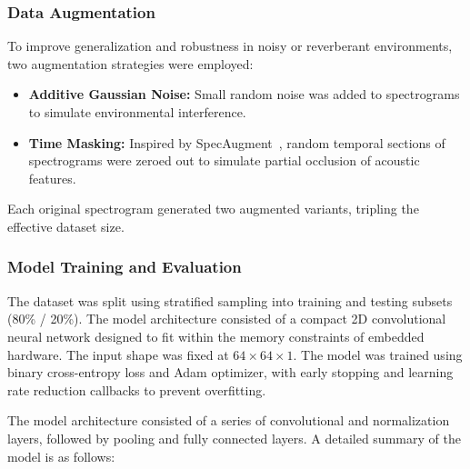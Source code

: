 \subsubsection{Data Augmentation}
To improve generalization and robustness in noisy or reverberant environments, two augmentation strategies were employed:

\begin{itemize}
  \item \textbf{Additive Gaussian Noise:} Small random noise was added to spectrograms to simulate environmental interference.
  \item \textbf{Time Masking:} Inspired by SpecAugment~\cite{Park2019specaugment}, random temporal sections of spectrograms were zeroed out to simulate partial occlusion of acoustic features.
\end{itemize}

Each original spectrogram generated two augmented variants, tripling the effective dataset size.

\subsubsection{Model Training and Evaluation}
The dataset was split using stratified sampling into training and testing subsets (80\% / 20\%). The model architecture consisted of a compact 2D convolutional neural network designed to fit within the memory constraints of embedded hardware. The input shape was fixed at $64 \times 64 \times 1$. The model was trained using binary cross-entropy loss and Adam optimizer, with early stopping and learning rate reduction callbacks to prevent overfitting.

The model architecture consisted of a series of convolutional and normalization layers, followed by pooling and fully connected layers. A detailed summary of the model is as follows:


